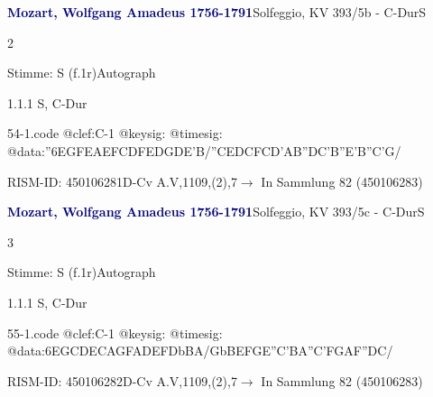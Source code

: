 \documentclass[a4paper, twocolumn, 11pt]{book}
\begin{document}
\par \vspace{16pt} \textcolor{darkblue}{\textbf{Mozart, Wolfgang Amadeus  1756-1791}}\hfillplus{[54]}\newline Solfeggio, KV 393/5b - C-Dur\newline S
\par \begin{itshape} 2\end{itshape} 
\par \textcolor{darkblue}{}  Stimme: S  (f.1r)\newline Autograph
\par 1.1.1  S, C-Dur  
\begin{filecontents*}{54-1.code}
@clef:C-1
@keysig:
@timesig:
@data:''{6EGFE}{AEFC}{DFED}{GDE'B}/''{CEDC}{FCD'A}{B''DC'B}{''E'B''C'G}/
\end{filecontents*}

\newline %
\par RISM-ID: 450106281\newline D-Cv  A.V,1109,(2),7\newline $\rightarrow$ In Sammlung 82 (450106283)
      
\par \vspace{16pt} \textcolor{darkblue}{\textbf{Mozart, Wolfgang Amadeus  1756-1791}}\hfillplus{[55]}\newline Solfeggio, KV 393/5c - C-Dur\newline S
\par \begin{itshape} 3\end{itshape} 
\par \textcolor{darkblue}{}  Stimme: S  (f.1r)\newline Autograph
\par 1.1.1  S, C-Dur  
\begin{filecontents*}{55-1.code}
@clef:C-1
@keysig:
@timesig:
@data:{6EGCD}{ECAG}{FADE}{FDbBA}/{GbBEF}{GE''C'B}{A''C'FG}{AF''DC}/
\end{filecontents*}

\newline %
\par RISM-ID: 450106282\newline D-Cv  A.V,1109,(2),7\newline $\rightarrow$ In Sammlung 82 (450106283)
      
\end{document}
